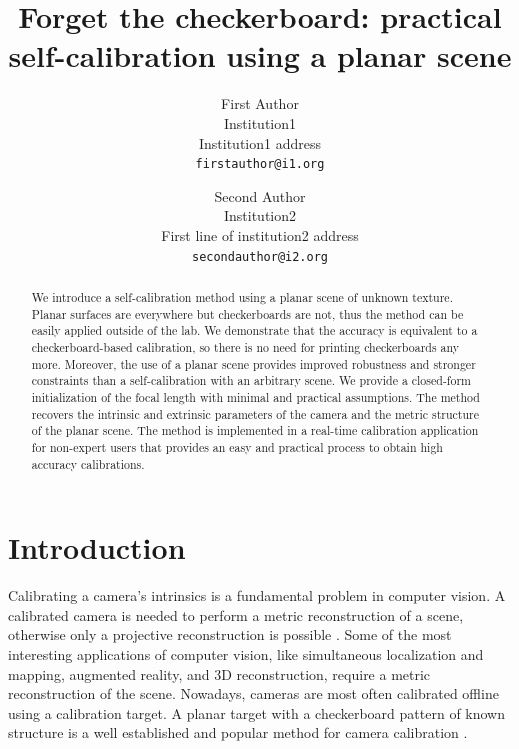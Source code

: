 \documentclass[10pt,twocolumn,letterpaper]{article}
\begin{document}
\title{Forget the checkerboard: practical self-calibration using a planar scene}

\author{First Author\\
Institution1\\
Institution1 address\\
{\tt\small firstauthor@i1.org}
\and
Second Author\\
Institution2\\
First line of institution2 address\\
{\tt\small secondauthor@i2.org}
}

\maketitle


\begin{abstract}
We introduce a self-calibration method using a planar scene of unknown texture. Planar surfaces are everywhere but checkerboards are not, thus the method can be easily applied outside of the lab. We demonstrate that the accuracy is equivalent to a checkerboard-based calibration, so there is no need for printing checkerboards any more. Moreover, the use of a planar scene provides improved robustness and stronger constraints than a self-calibration with an arbitrary scene. We provide a closed-form initialization of the focal length with minimal and practical assumptions. The method recovers the intrinsic and extrinsic parameters of the camera and the metric structure of the planar scene. The method is implemented in a real-time calibration application for non-expert users that provides an easy and practical process to obtain high accuracy calibrations. 
\end{abstract}

\section{Introduction}

Calibrating a camera's intrinsics is a fundamental problem in computer vision. A calibrated camera is needed to perform a metric reconstruction of a scene, otherwise only a projective reconstruction is possible \cite{hartley2000}. Some of the most interesting applications of computer vision, like simultaneous localization and mapping, augmented reality, and 3D reconstruction, require a metric reconstruction of the scene. Nowadays, cameras are most often calibrated offline using a calibration target. A planar target with a checkerboard pattern of known structure is a well established and popular method for camera calibration \cite{zhang1999,bouguetMCT}.
\end{document}
